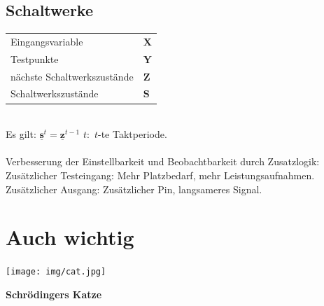\documentclass[6pt,a4paper]{scrartcl}
\newcommand{\utilde}[1]{#1}
\renewcommand{\emph}[1]{\textsf{\textbf{#1}}}
\renewcommand{\vec}[1]{\ensuremath{\underline{\boldsymbol {#1}}}}
\newcommand{\ma}[1]{\ensuremath{\utilde{\bs {#1}}}}
\newcommand{\bs}[1]{\ensuremath{\boldsymbol{#1}}}								%
\renewcommand{\vec}[1]{\ensuremath{\underline{\boldsymbol {#1}}}}
\begin{document}
\begin{multicols}{3}
	\subsection{Schaltwerke}
	\begin{tabular}{ll}
		Eingangsvariable 			& 		$\ma X$	\\
		Testpunkte 					& 		$\ma Y$	\\
		nächste Schaltwerkszustände & 		$\ma Z$	\\
		Schaltwerkszustände 		&		$\ma S$	\\
	\end{tabular}									\\
	
	Es gilt: $\vec s^t = \vec z^{t-1}$ \qquad $t:$ $t$-te Taktperiode.\\
	\\
	Verbesserung der Einstellbarkeit und Beobachtbarkeit durch Zusatzlogik:\\
	Zusätzlicher Testeingang: Mehr Platzbedarf, mehr Leistungsaufnahmen.\\
	Zusätzlicher Ausgang: Zusätzlicher Pin, langsameres Signal.\\
	
\section{Auch wichtig}
\parbox{1.2cm}{
 \texttt{[image: img/cat.jpg]}
 }
 \parbox{3cm}{
\emph{Schrödingers Katze}
}
\end{multicols}


\end{document}
